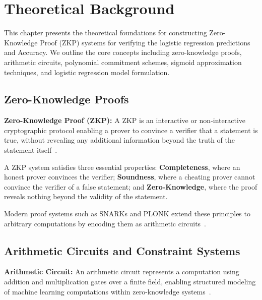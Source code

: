 \chapter{Theoretical Background}

This chapter presents the theoretical foundations for constructing Zero-Knowledge Proof (ZKP) systems for verifying the  logistic regression predictions and Accuracy. We outline the core concepts including zero-knowledge proofs, arithmetic circuits, polynomial commitment schemes, sigmoid approximation techniques, and logistic regression model formulation.

\section{Zero-Knowledge Proofs}

\begin{definition}\label{def:zkp}
\textbf{Zero-Knowledge Proof (ZKP):} A ZKP is an interactive or non-interactive cryptographic protocol enabling a prover to convince a verifier that a statement is true, without revealing any additional information beyond the truth of the statement itself~\cite{goldwasser1989knowledge}.
\end{definition}

A ZKP system satisfies three essential properties:  
\textbf{Completeness}, where an honest prover convinces the verifier;  
\textbf{Soundness}, where a cheating prover cannot convince the verifier of a false statement; and  
\textbf{Zero-Knowledge}, where the proof reveals nothing beyond the validity of the statement.

\begin{remark}
Modern proof systems such as SNARKs and PLONK extend these principles to arbitrary computations by encoding them as arithmetic circuits~\cite{kates2020plonk}.
\end{remark}

\section{Arithmetic Circuits and Constraint Systems}

\begin{definition}\label{def:circuits}
\textbf{Arithmetic Circuit:} An arithmetic circuit represents a computation using addition and multiplication gates over a finite field, enabling structured modeling of machine learning computations within zero-knowledge systems~\cite{gennaro2013quadratic}.
\end{definition}

